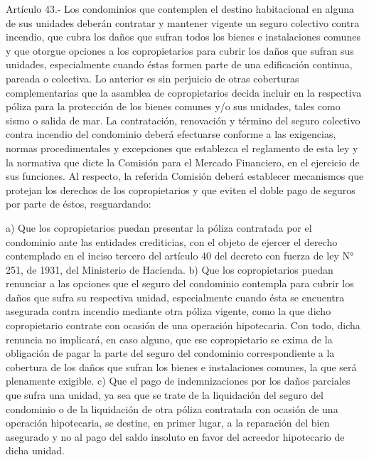      
    Artículo 43.- Los condominios que contemplen el destino habitacional en alguna de sus unidades deberán contratar y mantener vigente un seguro colectivo contra incendio, que cubra los daños que sufran todos los bienes e instalaciones comunes y que otorgue opciones a los copropietarios para cubrir los daños que sufran sus unidades, especialmente cuando éstas formen parte de una edificación continua, pareada o colectiva. Lo anterior es sin perjuicio de otras coberturas complementarias que la asamblea de copropietarios decida incluir en la respectiva póliza para la protección de los bienes comunes y/o sus unidades, tales como sismo o salida de mar.
    La contratación, renovación y término del seguro colectivo contra incendio del condominio deberá efectuarse conforme a las exigencias, normas procedimentales y excepciones que establezca el reglamento de esta ley y la normativa que dicte la Comisión para el Mercado Financiero, en el ejercicio de sus funciones.
    Al respecto, la referida Comisión deberá establecer mecanismos que protejan los derechos de los copropietarios y que eviten el doble pago de seguros por parte de éstos, resguardando:
     
    a) Que los copropietarios puedan presentar la póliza contratada por el condominio ante las entidades crediticias, con el objeto de ejercer el derecho contemplado en el inciso tercero del artículo 40 del decreto con fuerza de ley N° 251, de 1931, del Ministerio de Hacienda.
    b) Que los copropietarios puedan renunciar a las opciones que el seguro del condominio contempla para cubrir los daños que sufra su respectiva unidad, especialmente cuando ésta se encuentra asegurada contra incendio mediante otra póliza vigente, como la que dicho copropietario contrate con ocasión de una operación hipotecaria. Con todo, dicha renuncia no implicará, en caso alguno, que ese copropietario se exima de la obligación de pagar la parte del seguro del condominio correspondiente a la cobertura de los daños que sufran los bienes e instalaciones comunes, la que será plenamente exigible.
    c) Que el pago de indemnizaciones por los daños parciales que sufra una unidad, ya sea que se trate de la liquidación del seguro del condominio o de la liquidación de otra póliza contratada con ocasión de una operación hipotecaria, se destine, en primer lugar, a la reparación del bien asegurado y no al pago del saldo insoluto en favor del acreedor hipotecario de dicha unidad.
     
